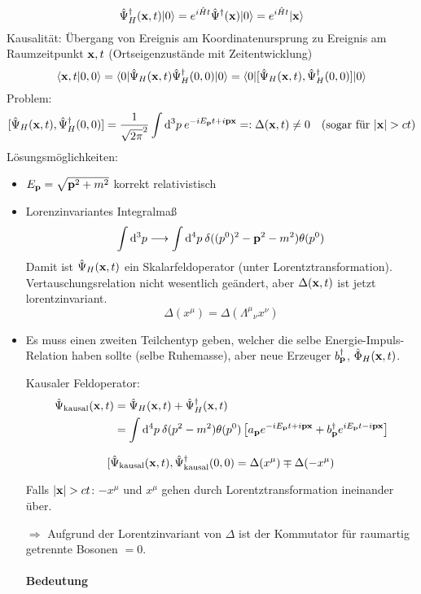 \documentclass[11pt,a4paper]{report}
\begin{document}
$$\hat{\Psi}^\dagger_H(\mathbf{x},t)|0\rangle = e^{i\hat{H}t}\hat{\Psi}^\dagger (\mathbf{x})|0\rangle = e^{i\hat{H}t}|\mathbf{x}\rangle$$
Kausalität: Übergang von Ereignis am Koordinatenursprung zu Ereignis am Raumzeitpunkt $\mathbf{x},t$ (Ortseigenzustände mit Zeitentwicklung)
$$\langle \mathbf{x},t | 0,0 \rangle=\langle 0|\hat{\Psi}_H(\mathbf{x},t)\hat{\Psi}^\dagger_H(0,0)|0\rangle=\langle 0|[\hat{\Psi}_H(\mathbf{x},t),\hat{\Psi}^\dagger_H(0,0)]|0\rangle$$
Problem:
$$[\hat{\Psi}_H(\vf{x},t),\hat{\Psi}^\dagger_H(0,0)]=\frac{1}{\sqrt{2\pi}^2}\int\dif^3p\:e^{-iE_\vf{p}t+i\vf{p}\vf{x}}=:\Delta (\vf{x},t)\neq 0\quad \text{(sogar für }|\vf{x}|>ct\text{)}$$
Lösungsmöglichkeiten:
\begin{itemize}
\item $E_{\mathbf{p}}=\sqrt{\mathbf{p}^2+m^2}$ korrekt relativistisch
\item Lorenzinvariantes Integralmaß
$$\int\mathrm{d}^3p\longrightarrow\int\mathrm{d}^4p\:\delta ((p^0)^2-\mathbf{p}^2-m^2)\theta (p^0)$$
Damit ist $\hat{\Psi}_H(\mathbf{x},t)$ ein Skalarfeldoperator (unter Lorentztransformation). Vertauschungsrelation nicht wesentlich geändert, aber $\Delta (\mathbf{x},t)$ ist jetzt lorentzinvariant.
$$\Delta (x^\mu )=\Delta ({\Lambda^\mu}_\nu x^\nu)$$
\item Es muss einen zweiten Teilchentyp geben, welcher die selbe Energie-Impuls-Relation haben sollte (selbe Ruhemasse), aber neue Erzeuger $b^\dagger_{\mathbf{p}}$, $\hat{\Phi}_H (\mathbf{x},t)$.\par 

Kausaler Feldoperator:
\begin{align*}
\hat{\Psi}_{\text{kausal}}(\mathbf{x},t) &= \hat{\Psi}_H(\mathbf{x},t)+\hat{\Psi}_H^\dagger (\mathbf{x},t) \\
 &= \int\mathrm{d}^4p\:\delta (p^2-m^2)\theta (p^0)\left[ a_{\mathbf{p}}e^{-iE_{\mathbf{p}}t+i\mathbf{p}\mathbf{x}} + b^\dagger_{\mathbf{p}}e^{iE_{\mathbf{p}}t-i\mathbf{p}\mathbf{x}}\right]
\end{align*}

$$[\hat{\Psi}_{\text{kausal}}(\mathbf{x},t),\hat{\Psi}^\dagger_{\text{kausal}}(0,0)=\Delta (x^\mu )\mp \Delta (-x^\mu )$$

Falls $|\vf{x}|>ct$: $-x^\mu$ und $x^\mu$ gehen durch Lorentztransformation ineinander über.\par 
$\Rightarrow$ Aufgrund der Lorentzinvariant von $\Delta$ ist der Kommutator für raumartig getrennte Bosonen $=0$.

\paragraph{Bedeutung}


\end{itemize}
\end{document}
